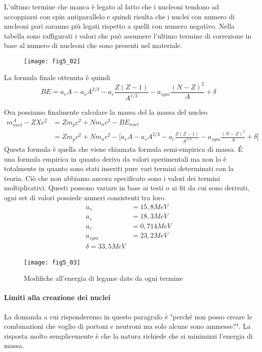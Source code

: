 L'ultimo termine che manca è legato al fatto che i nucleoni tendono ad accoppiarsi con spin antiparallelo e quindi risulta che i nuclei con numero di nucleoni pari saranno più legati rispetto a quelli con numero negativo.
Nella tabella sono raffigurati i valori che può assumere l'ultimo termine di correzione in base al numero di nucleoni che sono presenti nel materiale.
\begin{figure}[h]
\centering
\texttt{[image: fig5\_02]}
\end{figure}

La formula finale ottenuta è quindi
\begin{equation}
BE=a_vA-a_sA^{2/3}-a_c\frac{Z(Z-1)}{A^{1/3}}-a_{sym}\frac{(N-Z)^2}{A}+\delta
\end{equation}

Ora possiamo finalmente calcolare la massa del la massa del nucleo
\begin{equation}
\begin{split}
m_{nucl} ^A-Z X c^2 &=Z m_p c^2+N m_n c^2- BE_{nucl} \\
&=Zm_pc^2+Nm_nc^2-\biggl[ a_v A-a_s A^{2/3}-a_c \frac{Z(Z-1)}{A^{1/3}}-a_{sym}\frac{(N-Z)^2}{A}+\delta \biggl]
\end{split}
\end{equation}
Questa formula è quella che viene chiamata formula semi-empirica di massa.
\'E una formula empirica in quanto deriva da valori sperimentali ma non lo è totalmente in quanto sono stati inseriti pure vari termini determinati con la teoria.
Ciò che non abbiamo ancora specificato sono i valori dei termini moltiplicativi. 
Questi possono variare in base ai testi o ai fit da cui sono derivati, ogni set di valori possiede numeri consistenti tra loro.
\begin{equation}
\begin{split}
a_v &=15,8MeV\\
a_s&=18,3MeV\\
a_c&=0,714MeV\\
a_{sym}&=23,2MeV\\
\delta=33,5MeV
\end{split}
\end{equation}
\begin{figure}[h]
\centering
\texttt{[image: fig5\_03]}
\caption{Modifiche all'energia di legame date da ogni termine}
\end{figure}

\paragraph{Limiti alla creazione dei nuclei}
La domanda a cui risponderemo in questo paragrafo è "perché non posso creare le combinazioni che voglio di portoni e neutroni ma solo alcune sono ammesse?".
La risposta molto semplicemente è che la natura richiede che si minimizzi l'energia di massa.


